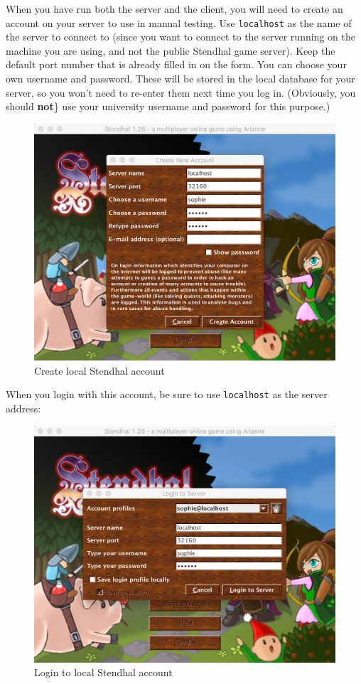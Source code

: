 \documentclass[
]{book}
\begin{document}
When you have run both the server and the client, you will need to create an account on your server to use in manual testing. Use \texttt{localhost} as the name of the server to connect to (since you want to connect to the server running on the machine you are using, and not the public Stendhal game server). Keep the default port number that is already filled in on the form. You can choose your own username and password. These will be stored in the local database for your server, so you won't need to re-enter them next time you log in. (Obviously, you should \textbf{not}\} use your university username and password for this purpose.)

\begin{figure}

{\centering \includegraphics[width=0.75\linewidth]{images/createLocalStendhalAccount} 

}

\caption{Create local Stendhal account}\label{fig:createLocalStendhalAccount-fig}
\end{figure}

When you login with this account, be sure to use \texttt{localhost} as the server address:

\begin{figure}

{\centering \includegraphics[width=0.75\linewidth]{images/loginToLocalStendhalAccount} 

}

\caption{Login to local Stendhal account}\label{fig:loginToLocalStendhalAccount-fig}
\end{figure}
\end{document}
